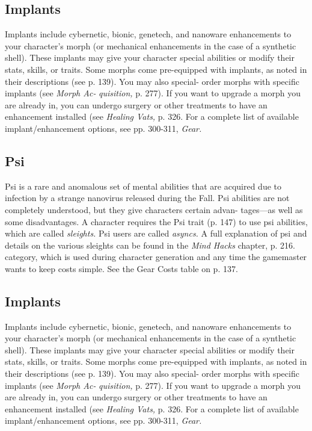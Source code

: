 \subsection{Implants}

Implants include cybernetic, bionic, genetech, and 
nanoware enhancements to your character's morph 
(or mechanical enhancements in the case of a synthetic 
shell). These implants may give your character special 
abilities or modify their stats, skills, or traits. Some 
morphs come pre-equipped with implants, as noted in 
their descriptions (see p. 139). You may also special-
order morphs with specific implants (see \textit{Morph Ac-}
\textit{quisition,} p. 277). If you want to upgrade a morph 
you are already in, you can undergo surgery or other 
treatments to have an enhancement installed (see 
\textit{Healing Vats,} p. 326. For a complete list of available 
implant/enhancement options, see pp. 300-311, \textit{Gear.}

\subsection{Psi}

Psi is a rare and anomalous set of mental abilities that 
are acquired due to infection by a strange nanovirus 
released during the Fall. Psi abilities are not completely 
understood, but they give characters certain advan-
tages—as well as some disadvantages. A character 
requires the Psi trait (p. 147) to use psi abilities, which 
are called \textit{sleights.} Psi users are called \textit{asyncs.} A full 
explanation of psi and details on the various sleights 
can be found in the \textit{Mind Hacks }chapter, p. 216.
category, which is used during character generation 
and any time the gamemaster wants to keep costs 
simple. See the Gear Costs table on p. 137.

\subsection{Implants}

Implants include cybernetic, bionic, genetech, and 
nanoware enhancements to your character's morph 
(or mechanical enhancements in the case of a synthetic 
shell). These implants may give your character special 
abilities or modify their stats, skills, or traits. Some 
morphs come pre-equipped with implants, as noted in 
their descriptions (see p. 139). You may also special-
order morphs with specific implants (see \textit{Morph Ac-}
\textit{quisition,} p. 277). If you want to upgrade a morph 
you are already in, you can undergo surgery or other 
treatments to have an enhancement installed (see 
\textit{Healing Vats,} p. 326. For a complete list of available 
implant/enhancement options, see pp. 300-311, \textit{Gear.}


